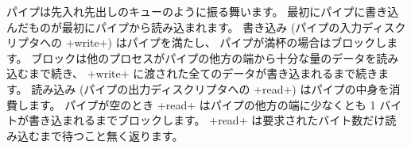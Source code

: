 パイプは先入れ先出しのキューのように振る舞います。
最初にパイプに書き込んだものが最初にパイプから読み込まれます。
書き込み (パイプの入力ディスクリプタへの \ml+write+) はパイプを満たし、
パイプが満杯の場合はブロックします。
ブロックは他のプロセスがパイプの他方の端から十分な量のデータを読み込むまで続き、
\ml+write+ に渡された全てのデータが書き込まれるまで続きます。
読み込み (パイプの出力ディスクリプタへの \ml+read+) はパイプの中身を消費します。
パイプが空のとき \ml+read+ はパイプの他方の端に少なくとも 1 バイトが書き込まれるまでブロックします。
\ml+read+ は要求されたバイト数だけ読み込むまで待つこと無く返ります。

